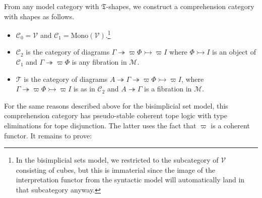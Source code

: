 \documentclass[12pt]{amsart}
\theoremstyle{plain}
\theoremstyle{definition}
\theoremstyle{remark}
\numberwithin{equation}{section}
\newcommand{\C}{\mathcal{C}}
\newcommand{\T}{\mathcal{T}}
\newcommand{\M}{\mathcal{M}}
\newcommand{\V}{\mathcal{V}}
\newcommand{\fT}{\mathfrak{T}}
\begin{document}
From any model category with $\fT$-shapes, we construct a comprehension category with shapes as follows.
\begin{itemize}
\item $\C_0 = \V$ and $\C_1 = \mathrm{Mono}(\V)$.\footnote{In the bisimplicial sets model, we restricted to the subcategory of $\V$ consisting of cubes, but this is immaterial since the image of the interpretation functor from the syntactic model will automatically land in that subcategory anyway.}
\item $\C_2$ is the category of diagrams $\Gamma \twoheadrightarrow \varpi\Phi\rightarrowtail \varpi I$ where $\Phi\rightarrowtail I$ is an object of $\C_1$ and $\Gamma\twoheadrightarrow \varpi\Phi$ is any fibration in $\M$.
\item $\T$ is the category of diagrams $A \twoheadrightarrow \Gamma \twoheadrightarrow \varpi\Phi\rightarrowtail \varpi I$, where $\Gamma \twoheadrightarrow \varpi\Phi\rightarrowtail \varpi I$ is as in $\C_2$ and $A \twoheadrightarrow \Gamma$ is a fibration in $\M$.
\end{itemize}
For the same reasons described above for the bisimplicial set model, this comprehension category has pseudo-stable coherent tope logic with type eliminations for tope disjunction.
The latter uses the fact that $\varpi$ is a coherent functor.
It remains to prove:
\end{document}

